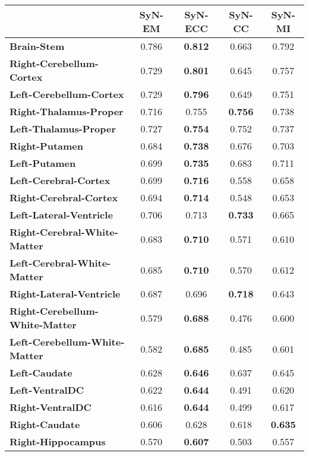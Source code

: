 \begin{table}[htbp]
  \centering
  {\small
    \begin{tabular}{lcccc}
    \toprule
          & \textbf{SyN-EM} & \textbf{SyN-ECC} & \textbf{SyN-CC} & \textbf{SyN-MI} \\
    \midrule
    \textbf{Brain-Stem} & 0.786 & \textbf{0.812} & 0.663 & 0.792 \\
    \textbf{Right-Cerebellum-Cortex} & 0.729 & \textbf{0.801} & 0.645 & 0.757 \\
    \textbf{Left-Cerebellum-Cortex} & 0.729 & \textbf{0.796} & 0.649 & 0.751 \\
    \textbf{Right-Thalamus-Proper} & 0.716 & 0.755 & \textbf{0.756} & 0.738 \\
    \textbf{Left-Thalamus-Proper} & 0.727 & \textbf{0.754} & 0.752 & 0.737 \\
    \textbf{Right-Putamen} & 0.684 & \textbf{0.738} & 0.676 & 0.703 \\
    \textbf{Left-Putamen} & 0.699 & \textbf{0.735} & 0.683 & 0.711 \\
    \textbf{Left-Cerebral-Cortex} & 0.699 & \textbf{0.716} & 0.558 & 0.658 \\
    \textbf{Right-Cerebral-Cortex} & 0.694 & \textbf{0.714} & 0.548 & 0.653 \\
    \textbf{Left-Lateral-Ventricle} & 0.706 & 0.713 & \textbf{0.733} & 0.665 \\
    \textbf{Right-Cerebral-White-Matter} & 0.683 & \textbf{0.710} & 0.571 & 0.610 \\
    \textbf{Left-Cerebral-White-Matter} & 0.685 & \textbf{0.710} & 0.570 & 0.612 \\
    \textbf{Right-Lateral-Ventricle} & 0.687 & 0.696 & \textbf{0.718} & 0.643 \\
    \textbf{Right-Cerebellum-White-Matter} & 0.579 & \textbf{0.688} & 0.476 & 0.600 \\
    \textbf{Left-Cerebellum-White-Matter} & 0.582 & \textbf{0.685} & 0.485 & 0.601 \\
    \textbf{Left-Caudate} & 0.628 & \textbf{0.646} & 0.637 & 0.645 \\
    \textbf{Left-VentralDC} & 0.622 & \textbf{0.644} & 0.491 & 0.620 \\
    \textbf{Right-VentralDC} & 0.616 & \textbf{0.644} & 0.499 & 0.617 \\
    \textbf{Right-Caudate} & 0.606 & 0.628 & 0.618 & \textbf{0.635} \\
    \textbf{Right-Hippocampus} & 0.570 & \textbf{0.607} & 0.503 & 0.557 \\

\end{tabular}}
\end{table}

